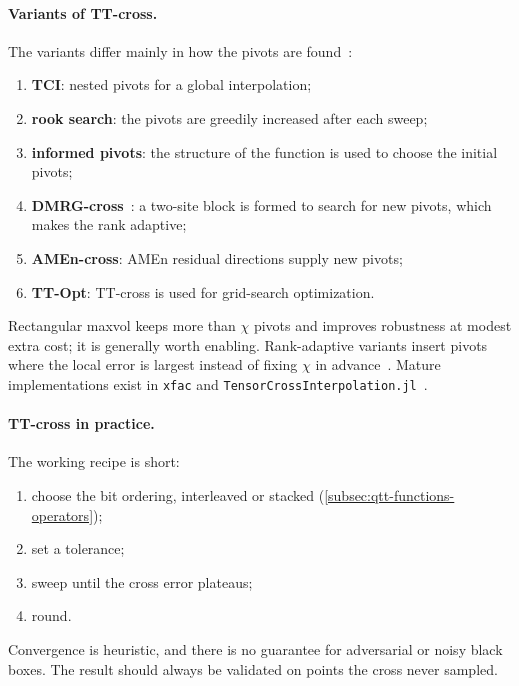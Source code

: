 \paragraph{Variants of TT-cross.}
The variants differ mainly in how the pivots are found~\cite{Nunez2025}:
\begin{enumerate}
  \item \textbf{TCI}: nested pivots for a global interpolation;
  \item \textbf{rook search}: the pivots are greedily increased after each
    sweep;
  \item \textbf{informed pivots}: the structure of the function is used to
    choose the initial pivots;
  \item \textbf{DMRG-cross}~\cite{Savostyanov2011}: a two-site block is formed
    to search for new pivots, which makes the rank adaptive;
  \item \textbf{AMEn-cross}: AMEn residual directions supply new pivots;
  \item \textbf{TT-Opt}: TT-cross is used for grid-search optimization.
\end{enumerate}
Rectangular maxvol keeps more than $\chi$ pivots and improves robustness at
modest extra cost; it is generally worth enabling. Rank-adaptive variants insert
pivots where the local error is largest instead of fixing $\chi$ in
advance~\cite{Nunez2025}. Mature implementations exist in \texttt{xfac} and
\texttt{Tensor\-Cross\-Inter\-polation.jl}~\cite{Nunez2025}.

\paragraph{TT-cross in practice.}
The working recipe is short:
\begin{enumerate}
  \item choose the bit ordering, interleaved or stacked
    (\cref{subsec:qtt-functions-operators});
  \item set a tolerance;
  \item sweep until the cross error plateaus;
  \item round.
\end{enumerate}
Convergence is heuristic, and there is no guarantee for adversarial or noisy
black boxes. The result should always be validated on points the cross never
sampled.

